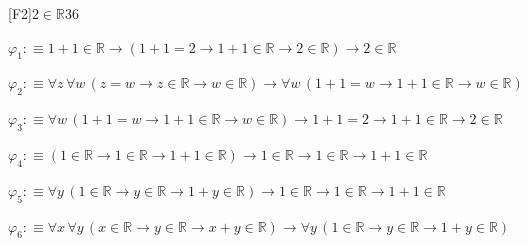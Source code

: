 \begin{fullproof}{[F2]}{$2 \in \mathbb{R}$}{36}
\begin{ptree}
\noLine
{}
\noLine
{}
\end{ptree}
\begin{abbrevlist}
\item $\varphi_{1} :\equiv 1 + 1 \in \mathbb{R} \to (1 + 1 = 2 \to 1 + 1 \in \mathbb{R} \to 2 \in \mathbb{R}) \to 2 \in \mathbb{R}$
\item $\varphi_{2} :\equiv \forall z\,\forall w\,(z = w \to z \in \mathbb{R} \to w \in \mathbb{R}) \to \forall w\,(1 + 1 = w \to 1 + 1 \in \mathbb{R} \to w \in \mathbb{R})$
\item $\varphi_{3} :\equiv \forall w\,(1 + 1 = w \to 1 + 1 \in \mathbb{R} \to w \in \mathbb{R}) \to 1 + 1 = 2 \to 1 + 1 \in \mathbb{R} \to 2 \in \mathbb{R}$
\item $\varphi_{4} :\equiv (1 \in \mathbb{R} \to 1 \in \mathbb{R} \to 1 + 1 \in \mathbb{R}) \to 1 \in \mathbb{R} \to 1 \in \mathbb{R} \to 1 + 1 \in \mathbb{R}$
\item $\varphi_{5} :\equiv \forall y\,(1 \in \mathbb{R} \to y \in \mathbb{R} \to 1 + y \in \mathbb{R}) \to 1 \in \mathbb{R} \to 1 \in \mathbb{R} \to 1 + 1 \in \mathbb{R}$
\item $\varphi_{6} :\equiv \forall x\,\forall y\,(x \in \mathbb{R} \to y \in \mathbb{R} \to x + y \in \mathbb{R}) \to \forall y\,(1 \in \mathbb{R} \to y \in \mathbb{R} \to 1 + y \in \mathbb{R})$
\end{abbrevlist}
\end{fullproof}
